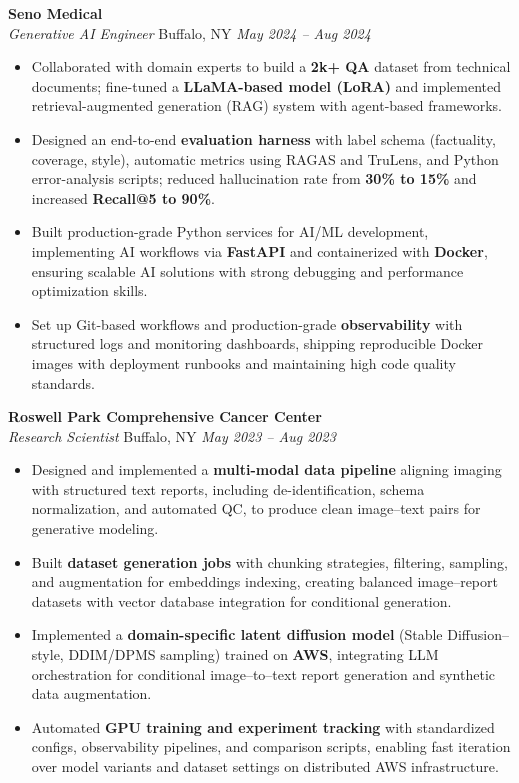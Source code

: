 \vspace*{-1pt}
\item \textbf{Seno Medical}\\
\textit{Generative AI Engineer} \hfill Buffalo, NY \quad \textit{May 2024 -- Aug 2024}
\vspace*{-3pt}
\begin{itemize}[leftmargin=0.2in, topsep=1pt]
  \item Collaborated with domain experts to build a \textbf{2k+ QA} dataset from technical documents; fine-tuned a \textbf{LLaMA-based model (LoRA)} and implemented retrieval-augmented generation (RAG) system with agent-based frameworks.
  \item Designed an end-to-end \textbf{evaluation harness} with label schema (factuality, coverage, style), automatic metrics using RAGAS and TruLens, and Python error-analysis scripts; reduced hallucination rate from \textbf{30\% to 15\%} and increased \textbf{Recall@5 to 90\%}.
  \item Built production-grade Python services for AI/ML development, implementing AI workflows via \textbf{FastAPI} and containerized with \textbf{Docker}, ensuring scalable AI solutions with strong debugging and performance optimization skills.
  \item Set up Git-based workflows and production-grade \textbf{observability} with structured logs and monitoring dashboards, shipping reproducible Docker images with deployment runbooks and maintaining high code quality standards.
\end{itemize}

\vspace*{-1pt}
\item \textbf{Roswell Park Comprehensive Cancer Center}\\
\textit{Research Scientist} \hfill Buffalo, NY \quad \textit{May 2023 -- Aug 2023}
\vspace*{-3pt}
\begin{itemize}[leftmargin=0.2in, topsep=1pt]
  \item Designed and implemented a \textbf{multi-modal data pipeline} aligning imaging with structured text reports, including de-identification, schema normalization, and automated QC, to produce clean image–text pairs for generative modeling.
  \item Built \textbf{dataset generation jobs} with chunking strategies, filtering, sampling, and augmentation for embeddings indexing, creating balanced image–report datasets with vector database integration for conditional generation.
  \item Implemented a \textbf{domain-specific latent diffusion model} (Stable Diffusion–style, DDIM/DPMS sampling) trained on \textbf{AWS}, integrating LLM orchestration for conditional image–to–text report generation and synthetic data augmentation.
  \item Automated \textbf{GPU training and experiment tracking} with standardized configs, observability pipelines, and comparison scripts, enabling fast iteration over model variants and dataset settings on distributed AWS infrastructure.
\end{itemize}
